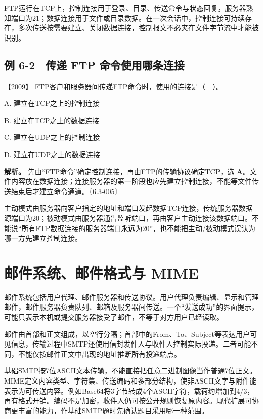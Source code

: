 FTP运行在TCP上，控制连接用于登录、目录、传送命令与状态回复，服务器熟知端口为21；数据连接用于文件或目录数据。在一次会话中，控制连接可持续存在，多次传送按需要建立、关闭数据连接，控制报文不必夹在文件字节流中才能被识别。

\subsection{例 6-2　传递 FTP 命令使用哪条连接}\label{cn-ex6-2}

\noindent{}【2009】 FTP客户和服务器间传递FTP命令时，使用的连接是（　）。

A. 建立在TCP之上的控制连接

B. 建立在TCP之上的数据连接

C. 建立在UDP之上的控制连接

D. 建立在UDP之上的数据连接


\textbf{解析。} 先由``FTP命令''确定控制连接，再由FTP的传输协议确定TCP，选 \textbf{A}。文件内容放在数据连接；连接服务器的第一阶段也应先建立控制连接，不能等文件传送结束后才建立命令通道。〖6.3-005〗

主动模式由服务器向客户指定的地址和端口发起数据TCP连接，传统服务器数据源端口为20；被动模式由服务器通告监听端口，再由客户主动连接该数据端口。不能说``所有FTP数据连接的服务器端口永远为20''，也不能把主动/被动模式误认为哪一方先建立控制连接。

\section{邮件系统、邮件格式与 MIME}\label{cn-06-05}

邮件系统包括用户代理、邮件服务器和传送协议。用户代理负责编辑、显示和管理邮件，邮件服务器负责队列、邮箱及服务器间传送。一个``发送成功''的界面提示，可能只表示本机或提交服务器接受了邮件，不等于对方用户已经读取。

邮件由首部和正文组成，以空行分隔；首部中的From、To、Subject等表达用户可见信息，传输过程中SMTP还使用信封发件人与收件人控制实际投递。二者可能不同，不能仅按邮件正文中出现的地址推断所有投递端点。

基础SMTP按7位ASCII文本传输，不能直接把任意二进制图像当作普通7位正文。MIME定义内容类型、字符集、传送编码和多部分结构，使非ASCII文字与附件能表示为可传送内容。例如Base64将3字节转成4个ASCII字符，载荷约增加到4/3，再有格式开销。编码不是加密，收件人仍可按公开规则恢复原内容。现代扩展可协商更丰富的能力，作基础SMTP题时先确认题目采用哪一种范围。

